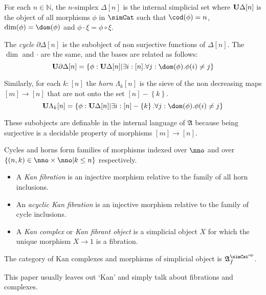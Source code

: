 \documentclass{tac}
\newcommand\hide[1]{}
\newcommand\set[1]{\left\{#1\right\}}
\newcommand\N{\mathbb N}
\newcommand\dual{^{\mathrm{op}}}
\newcommand\s{^{\simCat\dual}}
\newcommand\of{:}
\newcommand\simplex\Delta
\newcommand\cycle{\partial\Delta}
\newcommand\horn\Lambda
\newcommand\f{_f}
\newcommand\ambient{\mathfrak A}
\begin{document}
\hide{ Add def. of sieve over $\simCat$
Wrong: I was calling it a sieve because I was thinking of the category of elements of $\simplex[n]$
$\ambient\s$ defined?
Member functions for internal simplicial objects?
 }
\begin{definition} For each $n\in\N$, the $n$-simplex $\simplex[n]$ is the internal simplicial set where $\base{\simplex[n]}$ is the object of all morphisms $\phi$ in $\simCat$ such that $\cod(\phi) = n$, $\dim(\phi) = \dom(\phi)$ and $\phi\cdot \xi = \phi\circ \xi$.

The \emph{cycle} $\cycle[n]$ is the subobject of non surjective functions of $\simplex[n]$. The $\dim$ and $\cdot$ are the same, and the bases are related as follows:
\[ \base{\cycle[n]} = \set{\phi\of\base{\simplex[n]}| \exists i\of[n].\forall j\of \dom(\phi).\phi(i)\neq j } \]

Similarly, for each $k\of[n]$ the \emph{horn} $\horn_k[n]$ is the sieve of the non decreasing maps $[m]\to [n]$ that are not onto the set $[n]-\set{k}$.
\[ \base{\horn_k[n]} = \set{\phi\of\base{\simplex[n]}| \exists i\of[n]-\set k.\forall j\of \dom(\phi).\phi(i)\neq j } \]

\end{definition}

These subobjects are definable in the internal language of $\ambient$ because being surjective is a decidable property of morphisms $[m]\to[n]$.

\begin{definition} Cycles and horns form families of morphisms indexed over $\nno$ and over $\set{(n,k)\in\nno\times\nno| k\leq n }$ respectively.
\begin{itemize}
\item A \emph{Kan fibration} is an injective morphism relative to the family of all horn inclusions.
\item An \emph{acyclic Kan fibration} is an injective morphism relative to the family of cycle inclusions.
\item A \emph{Kan complex} or \emph{Kan fibrant object} is a simplicial object $X$ for which the unique morphism $X\to 1$ is a fibration.
\end{itemize}\label{Kan}

The category of Kan complexes and morphisms of simplicial object is $\ambient\s\f$. \hide{
In the categories we are looking at, the terminal object is projective. Therefore the internal and external concepts of having a filler operator coincide.
[I am so angry]
}
\end{definition}
This paper usually leaves out `Kan' and simply talk about fibrations and complexes.
\end{document}
